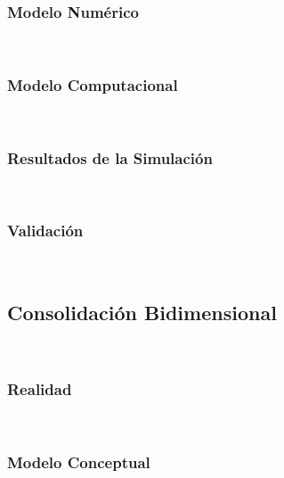 \subsubsection{Modelo Numérico}~\hypertarget{sec:sec3513}{}
\label{sec:sec3513}


\subsubsection{Modelo Computacional}~\hypertarget{sec:sec3514}{}
\label{sec:sec3514}


\subsubsection{Resultados de la Simulación}~\hypertarget{sec:sec3515}{}
\label{sec:sec3515}



\subsubsection{Validación}~\hypertarget{sec:sec3516}{}
\label{sec:sec3516}


\subsection{Consolidación Bidimensional}~\hypertarget{sec:sec352}{}
\label{sec:sec352}


\subsubsection{Realidad}~\hypertarget{sec:sec3521}{}
\label{sec:sec3521}


\subsubsection{Modelo Conceptual}~\hypertarget{sec:sec3522}{}
\label{sec:sec3522}



